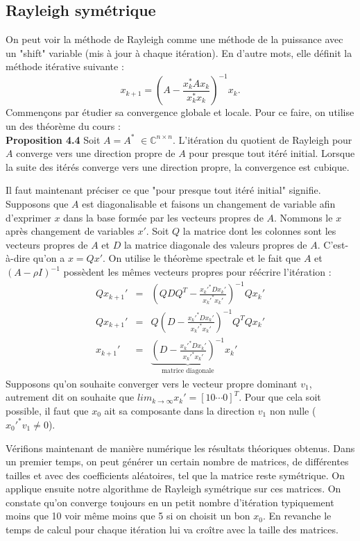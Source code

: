 \subsection*{Rayleigh symétrique}
On peut voir la méthode de Rayleigh comme une méthode de la puissance avec un "shift" variable (mis à jour à chaque itération). En d'autre mots, elle définit la méthode itérative suivante : 
$$x_{k+1} = \left(  A- \frac{x_k^*Ax_k}{x_k^*x_k}  \right)^{-1} x_k.  $$
Commençons par étudier sa convergence globale et locale. Pour ce faire, on utilise un des théorème du cours : \\
\textbf{Proposition 4.4} Soit $A = A^*$ $ \in \mathbb{C}^{n\times n}$. L'itération du quotient de Rayleigh pour $A$ converge vers une direction propre de $A$ pour presque tout itéré initial. Lorsque la suite des itérés converge vers une direction propre, la convergence est cubique. 

Il faut maintenant préciser ce que "pour presque tout itéré initial" signifie. Supposons que $A$ est diagonalisable et faisons un changement de variable afin d'exprimer $x$ dans la base formée par les vecteurs propres de $A$. Nommons le $x$ après changement de variables $x'$. Soit $Q$ la matrice dont les colonnes sont les vecteurs propres de $A$ et $D$ la matrice diagonale des valeurs propres de $A$. C'est-à-dire qu'on a $x = Qx'$. On utilise le théorème spectrale et le fait que $A$ et $(A-\rho I)^{-1}$ possèdent les mêmes vecteurs propres pour réécrire l'itération : 
\begin{eqnarray}
Qx_{k+1}' & = &(Q D Q^T - \frac{x_k'^* D x_k'}{x_k'^* x_k'})^{-1} Qx_{k}'\\
Qx_{k+1}' & = & Q(D-\frac{x_k'^* D x_k'}{x_k'^* x_k'})^{-1}Q^T Qx_k'\\
x_{k+1}' & = & \underbrace{(D-\frac{x_k'^* D x_k'}{x_k'^* x_k'})^{-1}}_{\text{matrice diagonale}} x_k'
\end{eqnarray}
Supposons qu'on souhaite converger vers le vecteur propre dominant $v_1$, autrement dit on souhaite que $lim_{k\rightarrow \infty} x_k' = [1 0 \cdots 0]^T$. Pour que cela soit possible, il faut que $x_0$ ait sa composante dans la direction $v_1$ non nulle ($x_0'^* v_1 \neq 0$). 

Vérifions maintenant de manière numérique les résultats théoriques obtenus. Dans un premier temps, on peut générer un certain nombre de matrices, de différentes tailles et avec des coefficients aléatoires, tel que la matrice reste symétrique. On applique ensuite notre algorithme de Rayleigh symétrique sur ces matrices. On constate qu'on converge toujours en un petit nombre d'itération typiquement moins que 10 voir même moins que 5 si on choisit un bon $x_0$. En revanche le temps de calcul pour chaque itération lui va croître avec la taille des matrices.

